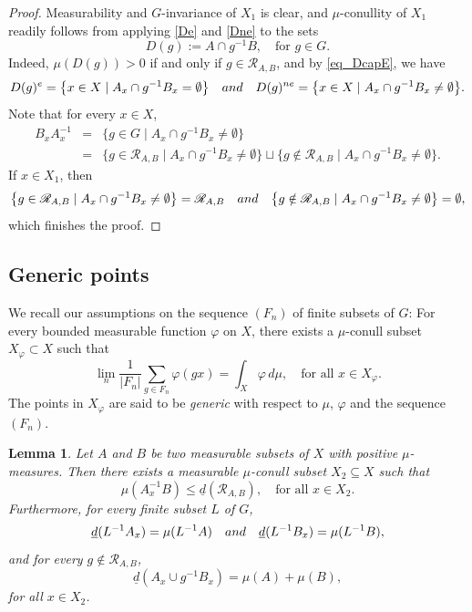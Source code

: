 \documentclass[11pt]{article}
\numberwithin{equation}{section}
\let\mathcal\mathscr
\newcommand{\cR}{\mathcal{R}}
\newcommand{\qand}{\quad\textup{and}\quad}
\theoremstyle{plain}
\newtheorem{lemma}[theorem]{Lemma}
\theoremstyle{definition}
\begin{document}
\begin{proof}
Measurability and $G$-invariance of $X_1$ is clear, and $\mu$-conullity of $X_1$ readily follows from applying \eqref{De} and \eqref{Dne} to the sets
\[
D(g) := A \cap g^{-1}B, \quad \textrm{for $g \in G$}.
\]
Indeed, $\mu(D(g)) > 0$ if and only if $g \in \cR_{A,B}$, and by \eqref{eq_DcapE}, we have
\[
D(g)^{e} = \bigl\{ x \in X \mid  A_x \cap g^{-1} B_x = \emptyset \bigr\}
\qand
D(g)^{ne} = \bigl\{ x \in X \mid  A_x \cap g^{-1}B_x \neq \emptyset \bigr\}.
\]
Note that for every $x \in X$,
\begin{eqnarray*}
B_x A^{-1}_x
&=&
\bigl\{ g \in G \mid  A_x \cap g^{-1} B_x \neq \emptyset \bigr\} \\[2pt]
&=&
\bigl\{ g \in \cR_{A,B} \mid  A_x \cap g^{-1} B_x \neq \emptyset \bigr\} \sqcup \bigl\{ g \notin \cR_{A,B} \mid  A_x \cap g^{-1} B_x \neq \emptyset \bigr\}.
\end{eqnarray*}
If $x \in X_1$, then
\[
\bigl\{ g \in \cR_{A,B} \mid  A_x \cap g^{-1} B_x \neq \emptyset \bigr\} = \cR_{A,B}
\qand
\bigl\{ g \notin \cR_{A,B} \mid  A_x \cap g^{-1} B_x \neq \emptyset \bigr\} = \emptyset,
\]
which finishes the proof.
\end{proof}

\subsection{Generic points}

We recall our assumptions on the sequence $(F_n)$ of finite subsets of $G$: For every bounded measurable function $\varphi$ on $X$,
there exists a $\mu$-conull subset $X_\varphi \subset X$ such that
\[
\lim_n \frac{1}{|F_n|} \sum_{g \in F_n} \varphi(gx) = \int_X \varphi \, d\mu, \quad \textrm{for all $x \in X_\varphi$}.
\]
The points in $X_\varphi$ are said to be \emph{generic} with respect to $\mu$, $\varphi$ and the sequence $(F_n)$.
\begin{lemma}
\label{lemma_generic}
Let $A$ and $B$ be two measurable subsets of $X$ with positive $\mu$-measures. Then there exists a measurable $\mu$-conull subset $X_2 \subseteq X$
such that
\[
\mu(A_x^{-1}B) \leq \underline{d}(\cR_{A,B}), \quad \textrm{for all $x \in X_2$}.
\]
Furthermore, for every finite subset $L$ of $G$,
\[
\underline{d}(L^{-1}A_x) = \mu(L^{-1}A) \qand \underline{d}(L^{-1}B_x) = \mu(L^{-1}B),
\]
and for every $g \notin \cR_{A,B}$,
\[
\underline{d}(A_x \cup g^{-1}B_x) = \mu(A) + \mu(B),
\]
for all $x \in X_2$.
\end{lemma}
\end{document}
